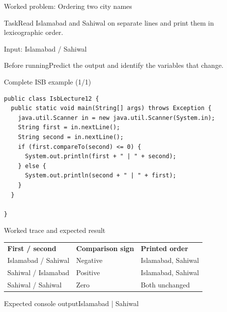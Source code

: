 \documentclass[10pt,aspectratio=169]{beamer}
\begin{document}
\begin{frame}[fragile,t]{Worked problem: Ordering two city names}
\begin{block}{Task}Read Islamabad and Sahiwal on separate lines and print them in lexicographic order.\end{block}
\small Input: Islamabad / Sahiwal\par\vspace{3mm}\begin{exampleblock}{Before running}Predict the output and identify the variables that change.\end{exampleblock}
\end{frame}

\begin{frame}[fragile,t]{Complete ISB example (1/1)}
\begin{lstlisting}
public class IsbLecture12 {
  public static void main(String[] args) throws Exception {
    java.util.Scanner in = new java.util.Scanner(System.in);
    String first = in.nextLine();
    String second = in.nextLine();
    if (first.compareTo(second) <= 0) {
      System.out.println(first + " | " + second);
    } else {
      System.out.println(second + " | " + first);
    }
  }

}
\end{lstlisting}
\end{frame}

\begin{frame}[fragile,t]{Worked trace and expected result}
\small\renewcommand{\arraystretch}{1.4}
\begin{tabularx}{\textwidth}{>{\raggedright\arraybackslash}X>{\raggedright\arraybackslash}X>{\raggedright\arraybackslash}X}\rowcolor{navy}
\color{white}\bfseries First / second & \color{white}\bfseries Comparison sign & \color{white}\bfseries Printed order\\
Islamabad / Sahiwal & Negative & Islamabad, Sahiwal\\
Sahiwal / Islamabad & Positive & Islamabad, Sahiwal\\
Sahiwal / Sahiwal & Zero & Both unchanged\\
\end{tabularx}\par\vspace{2mm}
\begin{block}{Expected console output}\ttfamily\footnotesize Islamabad | Sahiwal\end{block}
\end{frame}
\end{document}
